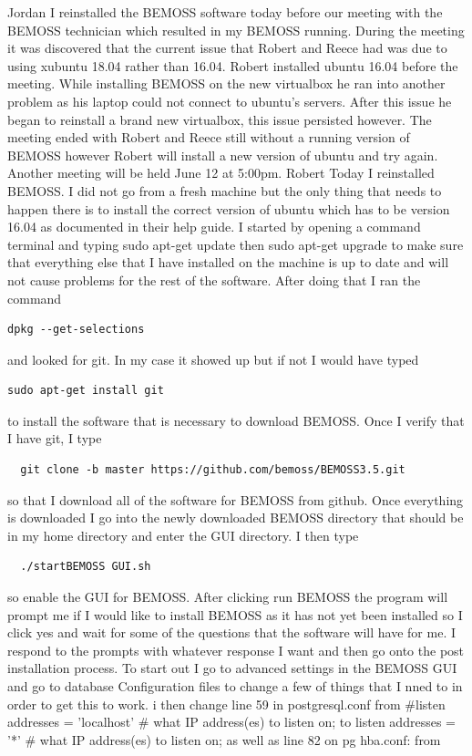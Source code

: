 \documentclass[fontsize=11pt, %
                             paper=letter, %
                             twoside, %
                             captions=tableheading,
                             index=totoc,
                             hyperref]{labbook}
\begin{document}
Jordan \newline
I reinstalled the BEMOSS software today before our meeting with the BEMOSS technician which resulted in my BEMOSS running. During the meeting it was discovered that the current issue that Robert and Reece had was due to using xubuntu 18.04 rather than 16.04. Robert installed ubuntu 16.04 before the meeting. While installing BEMOSS on the new virtualbox he ran into another problem as his laptop could not connect to ubuntu's servers. After this issue he began to reinstall a brand new virtualbox, this issue persisted however. The meeting ended with Robert and Reece still without a running version of BEMOSS however Robert will install a new version of ubuntu and try again. Another meeting will be held June 12 at 5:00pm.
Robert \newline
Today I reinstalled BEMOSS. I did not go from a fresh machine but the only thing that needs to happen there is to install the correct version of ubuntu which has to be version 16.04 as documented in their help guide. I started by opening a command terminal and typing sudo apt-get update then sudo apt-get upgrade to make sure that everything else that I have installed on the machine is up to date and will not cause problems for the rest of the software. After doing that I ran the command %
%
\begin{verbatim}
dpkg --get-selections    
\end{verbatim}
%
and  looked for git. In my case it showed up but if not I would have typed %
%
\begin{verbatim}
sudo apt-get install git     
\end{verbatim}
%
to install the software that is necessary to download BEMOSS. Once I verify that I have git, I type %
%
\begin{verbatim}
  git clone -b master https://github.com/bemoss/BEMOSS3.5.git  
\end{verbatim}
%   
  so that I download all of the software for BEMOSS from github. Once everything is downloaded I go into the newly downloaded BEMOSS directory that should be in my home directory and enter the GUI directory. I then type 
  \begin{verbatim}
  ./startBEMOSS GUI.sh    
  \end{verbatim}
  so enable the GUI for BEMOSS. After clicking run BEMOSS the program will prompt me if I would like to install BEMOSS as it has not yet been installed so I click yes and wait for some of the questions that the software will have for me. I respond to the prompts with whatever response I want and then go onto the post installation process. To start out I go to advanced settings in the BEMOSS GUI and go to database Configuration files to change a few of things that I nned to in order to get this to work. i then change line 59 in postgresql.conf from \#listen addresses = 'localhost' \# what IP address(es) to listen on; to listen addresses = '*' \# what IP address(es) to listen on; as well as line 82 on pg hba.conf: from %
\end{document}
